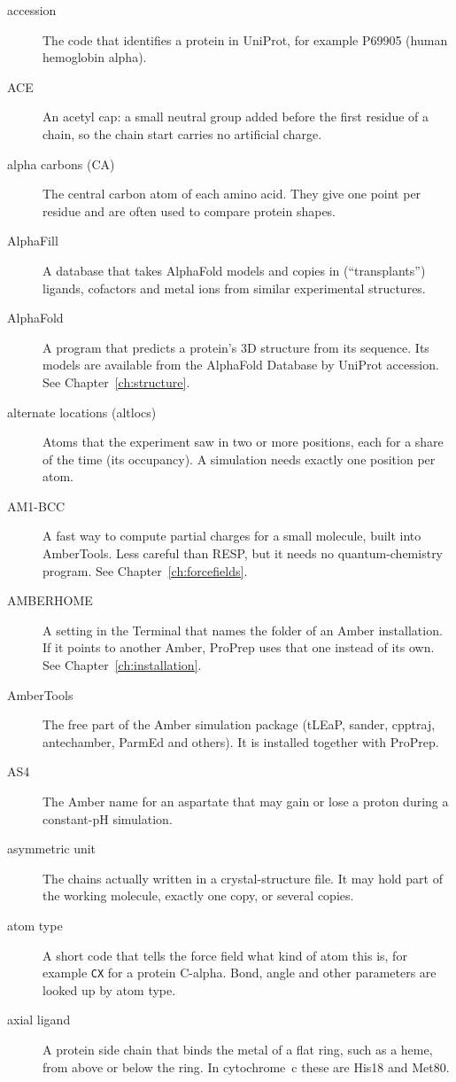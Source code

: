 \begin{description}
\item[accession] The code that identifies a protein in UniProt, for example
  P69905 (human hemoglobin alpha).
\item[ACE] An acetyl cap: a small neutral group added before the first residue
  of a chain, so the chain start carries no artificial charge.
\item[alpha carbons (CA)] The central carbon atom of each amino acid. They give
  one point per residue and are often used to compare protein shapes.
\item[AlphaFill] A database that takes AlphaFold models and copies in
  (``transplants'') ligands, cofactors and metal ions from similar
  experimental structures.
\item[AlphaFold] A program that predicts a protein's 3D structure from its
  sequence. Its models are available from the AlphaFold Database by UniProt
  accession. See Chapter~\ref{ch:structure}.
\item[alternate locations (altlocs)] Atoms that the experiment saw in two or
  more positions, each for a share of the time (its occupancy). A simulation
  needs exactly one position per atom.
\item[AM1-BCC] A fast way to compute partial charges for a small molecule,
  built into AmberTools. Less careful than RESP, but it needs no
  quantum-chemistry program. See Chapter~\ref{ch:forcefields}.
\item[AMBERHOME] A setting in the Terminal that names the folder of an Amber
  installation. If it points to another Amber, ProPrep uses that one instead of
  its own. See Chapter~\ref{ch:installation}.
\item[AmberTools] The free part of the Amber simulation package (tLEaP,
  sander, cpptraj, antechamber, ParmEd and others). It is installed together
  with ProPrep.
\item[AS4] The Amber name for an aspartate that may gain or lose a proton
  during a constant-pH simulation.
\item[asymmetric unit] The chains actually written in a crystal-structure
  file. It may hold part of the working molecule, exactly one copy, or
  several copies.
\item[atom type] A short code that tells the force field what kind of atom
  this is, for example \texttt{CX} for a protein C-alpha. Bond, angle and other
  parameters are looked up by atom type.
\item[axial ligand] A protein side chain that binds the metal of a flat ring,
  such as a heme, from above or below the ring. In cytochrome~c these are His18
  and Met80.
\end{description}

